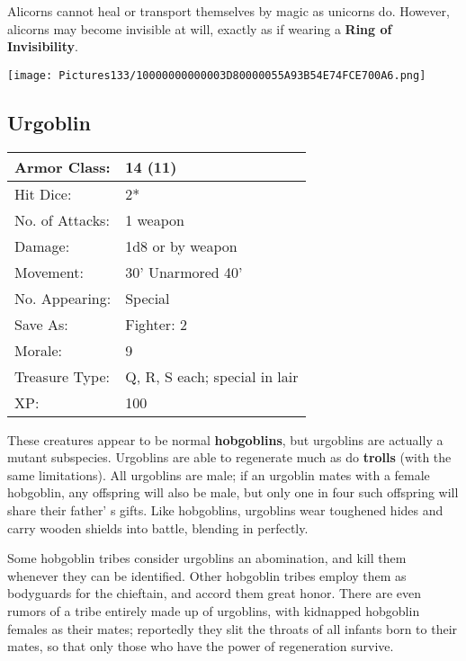 \documentclass[a4paper,twoside,openany,10pt]{book}
\begin{document}
\begin{multicols}{2}
Alicorns cannot heal or transport themselves by magic as unicorns do. However, alicorns may become invisible at will, exactly as if wearing a \textbf{Ring of Invisibility}.

\begin{center} \texttt{[image: Pictures133/10000000000003D80000055A93B54E74FCE700A6.png]} \end{center}


\subsection*{Urgoblin}\label{urgoblin}

\begin{tabularx}{0.50\textwidth}{@{}lX@{}}
Armor Class: & 14 (11) \\\hline
Hit Dice: & 2* \\\hline
No. of Attacks: & 1 weapon \\\hline
Damage: & 1d8 or by weapon \\\hline
Movement: & 30' Unarmored 40' \\\hline
No. Appearing: & Special \\\hline
Save As: & Fighter: 2 \\\hline
Morale: & 9 \\\hline
Treasure Type: & Q, R, S each; special in lair \\\hline
XP: & 100 \\\hline
\end{tabularx}\medskip

These creatures appear to be normal \textbf{hobgoblins}, but urgoblins are actually a mutant subspecies. Urgoblins are able to regenerate much as do \textbf{trolls} (with the same limitations). All urgoblins are male; if an urgoblin mates with a female hobgoblin, any offspring will also be male, but only one in four such offspring will share their father' s gifts. Like hobgoblins, urgoblins wear toughened hides and carry wooden shields into battle, blending in perfectly.

Some hobgoblin tribes consider urgoblins an abomination, and kill them whenever they can be identified. Other hobgoblin tribes employ them as bodyguards for the chieftain, and accord them great honor. There are even rumors of a tribe entirely made up of urgoblins, with kidnapped hobgoblin females as their mates; reportedly they slit the throats of all infants born to their mates, so that only those who have the power of regeneration survive.


\end{multicols}
\end{document}
